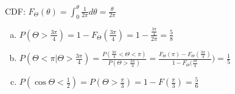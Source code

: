 \documentclass[12pt]{article}
\newenvironment{problem}[2][Problem]{\begin{trivlist}
\item[\hskip \labelsep {\bfseries #1}\hskip \labelsep {\bfseries #2.}]
  \vspace{1 cm}
}{\end{trivlist}}
\begin{document}
\begin{problem}{3.27} %
\item
  CDF: $F_\Theta (\theta) = \int_0^{\theta} \frac{1}{2\pi} d\theta = \frac{\theta}{2\pi}$
  \begin{enumerate}[a.]
    \item %
      $P(\Theta > \frac{3\pi}{4}) = 1 - F_{\Theta}(\frac{3\pi}{4}) 
        = 1 - \frac{\frac{3\pi}{4}}{2\pi} = \frac{5}{8}$
      \item %
        $P(\Theta < \pi | \Theta > \frac{3\pi}{4}) 
          = \frac{P(\frac{3\pi}{4}<\Theta<\pi)}{P(\Theta > \frac{3\pi}{4})} 
          = \frac{F_\Theta(\pi) - F_\Theta(\frac{3\pi}{4})}{1-F_\Theta(\frac{3\pi}{4}})
          = \frac{1}{5}$
        \item %
          $P(\cos{\Theta} < \frac{1}{2}) = P(\Theta > \frac{\pi}{3})
          = 1-F(\frac{\pi}{3}) = \frac{5}{6}$
        \end{enumerate}
\end{problem}

\begin{problem}{3.29} %
\item
\end{problem}

\begin{problem}{3.31} %
\item
\end{problem}

\begin{problem}{3.33} %
\item
\end{problem}
\end{document}
